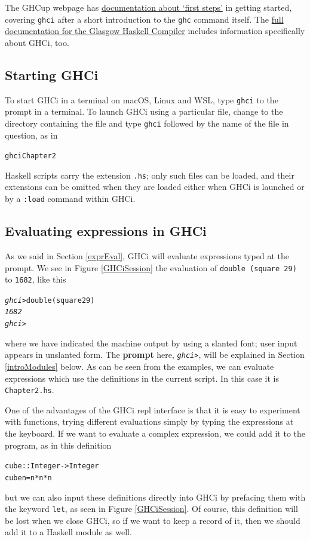 The GHCup webpage has \href{https://www.haskell.org/ghcup/steps/}{documentation about `first steps'} in getting started, covering \texttt{ghci} after a short introduction to the \texttt{ghc} command itself.
The \href{https://downloads.haskell.org/ghc/latest/docs/users_guide/}{full documentation for the Glasgow Haskell Compiler} includes information specifically about GHCi, too.


\subsection*{Starting GHCi}

To start GHCi in a terminal on macOS, Linux and WSL, type \texttt{ghci}
to the prompt in a terminal. To launch GHCi using a particular file, change to the directory containing the file and type
\texttt{ghci} followed by the name of the file in question, as in
\begin{alltt}
ghci Chapter2
\end{alltt} 
Haskell scripts carry the extension \texttt{.hs}; only such files can be loaded, and their extensions
can be omitted when they are loaded either when GHCi is launched or by a
\texttt{:load} command within GHCi.

\subsection*{Evaluating expressions in GHCi}

As we said in Section \ref{exprEval}, GHCi will evaluate
expressions typed at the prompt. We see in Figure \ref{GHCiSession} the
evaluation of \texttt{double (square 29)} to \texttt{1682}, like this
\begin{alltt}
\textsl{ghci>} double (square 29)
\textsl{1682}
\textsl{ghci>}
\end{alltt}
where we have indicated the machine output by using a slanted font; user input appears
in unslanted form. The \textbf{prompt} here, \texttt{\textsl{ghci>}}, will be explained in
Section \ref{introModules} below.
As can be seen from the examples, we can evaluate expressions which use
the definitions in the current script. In this case it is \texttt{Chapter2.hs}.

One of the advantages of the GHCi repl interface is that it is easy to
experiment with functions, trying different evaluations simply by typing
the expressions at the keyboard. If we want to evaluate a complex
expression, we could add it to the program, as in this 
definition
\begin{alltt}
cube :: Integer -> Integer
cube n = n*n*n
\end{alltt}
but we can also input these definitions directly into GHCi by prefacing them with the keyword \texttt{let}, as seen in Figure \ref{GHCiSession}. Of course, this definition will be lost when we close GHCi, so if we want to keep a record of it, then we should add it to a Haskell module as well.

